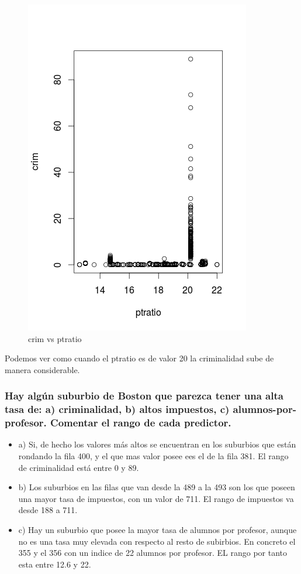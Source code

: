 \begin{figure}[H]
\centering
\includegraphics[scale=0.70]{crimvsptratio.png}
\caption{crim vs ptratio}
\label{}
\end{figure} 

Podemos ver como cuando el ptratio es de valor 20 la criminalidad sube de manera considerable.
\newpage
\subsubsection{Hay algún suburbio de Boston que parezca tener una alta tasa de: a) criminalidad, b) altos impuestos, c) alumnos-por-profesor. Comentar el rango de cada predictor.}

\begin{itemize}

\item a) Si, de hecho los valores más altos se encuentran en los suburbios que están rondando la fila 400, y el que mas valor posee ees el de la fila 381. El rango de criminalidad está entre 0 y 89.

\item b) Los suburbios en las filas que van desde la 489 a la  493 son los que poseen una mayor tasa de impuestos, con un valor de 711. El rango de impuestos va desde 188 a 711.

\item c) Hay un suburbio que posee la mayor tasa de alumnos por profesor, aunque no es una tasa muy elevada con respecto al resto de subirbios. En concreto el 355 y el 356 con un indice de 22 alumnos por profesor. EL rango por tanto esta entre 12.6 y 22.


\end{itemize}

